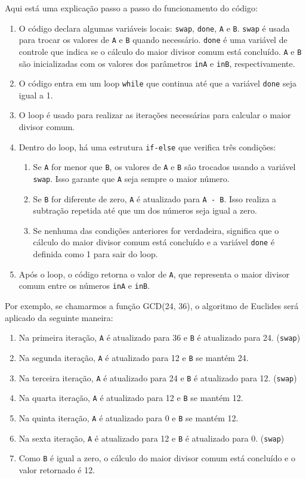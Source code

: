 \documentclass[a4paper,11pt]{article} %
\begin{document}
Aqui está uma explicação passo a passo do funcionamento do código:
\begin{enumerate}
    \item O código declara algumas variáveis locais: \texttt{swap}, \texttt{done}, \texttt{A} e \texttt{B}. \texttt{swap} é usada para trocar os valores de \texttt{A} e \texttt{B} quando necessário. \texttt{done} é uma variável de controle que indica se o cálculo do maior divisor comum está concluído. \texttt{A} e \texttt{B} são inicializadas com os valores dos parâmetros \texttt{inA} e \texttt{inB}, respectivamente.
    \item O código entra em um loop \texttt{while} que continua até que a variável \texttt{done} seja igual a 1.
    \item O loop é usado para realizar as iterações necessárias para calcular o maior divisor comum.
    \item Dentro do loop, há uma estrutura \texttt{if-else} que verifica três condições:
    \begin{enumerate}
        \item Se \texttt{A} for menor que \texttt{B}, os valores de \texttt{A} e \texttt{B} são trocados usando a variável \texttt{swap}. Isso garante que \texttt{A} seja sempre o maior número.
        \item Se \texttt{B} for diferente de zero, \texttt{A} é atualizado para \texttt{A - B}. Isso realiza a subtração repetida até que um dos números seja igual a zero.
        \item Se nenhuma das condições anteriores for verdadeira, significa que o cálculo do maior divisor comum está concluído e a variável \texttt{done} é definida como 1 para sair do loop.
    \end{enumerate}
    \item Após o loop, o código retorna o valor de \texttt{A}, que representa o maior divisor comum entre os números \texttt{inA} e \texttt{inB}.
\end{enumerate}

Por exemplo, se chamarmos a função GCD(24, 36), o algoritmo de Euclides será aplicado da seguinte maneira:

\begin{enumerate}
    \item Na primeira iteração, \texttt{A} é atualizado para 36 e \texttt{B} é atualizado para 24. (\texttt{swap})
    \item Na segunda iteração, \texttt{A} é atualizado para 12 e \texttt{B} se mantém 24. 
    \item Na terceira iteração, \texttt{A} é atualizado para 24 e \texttt{B} é atualizado para 12. (\texttt{swap})
    \item Na quarta iteração, \texttt{A} é atualizado para 12 e \texttt{B} se mantém 12.
    \item Na quinta iteração, \texttt{A} é atualizado para 0 e \texttt{B} se mantém 12.
    \item Na sexta iteração, \texttt{A} é atualizado para 12 e \texttt{B} é atualizado para 0. (\texttt{swap})
    \item Como \texttt{B} é igual a zero, o cálculo do maior divisor comum está concluído e o valor retornado é 12.
\end{enumerate}
\end{document}

